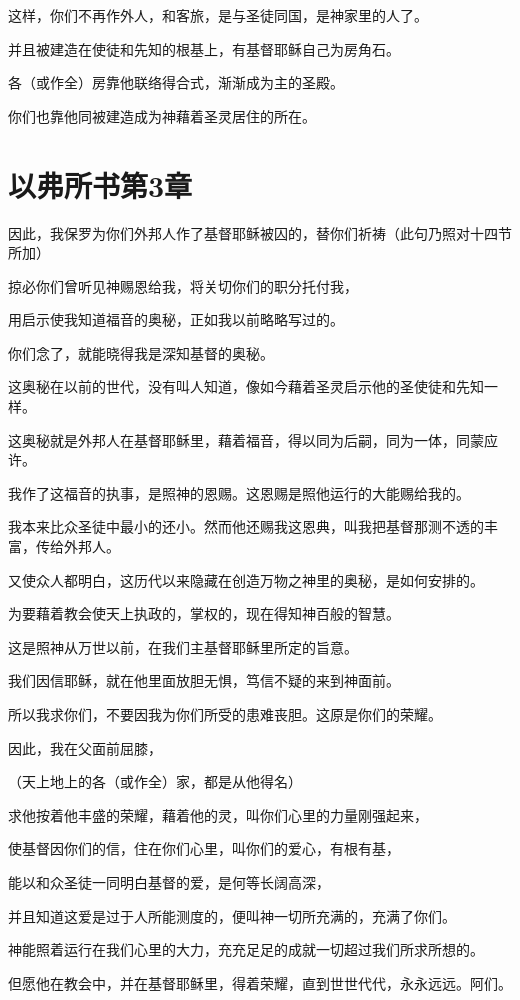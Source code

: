 \documentclass[12pt,oneside]{book}
\begin{document}
这样，你们不再作外人，和客旅，是与圣徒同国，是神家里的人了。

并且被建造在使徒和先知的根基上，有基督耶稣自己为房角石。

各（或作全）房靠他联络得合式，渐渐成为主的圣殿。

你们也靠他同被建造成为神藉着圣灵居住的所在。

\chapter{以弗所书第3章}
因此，我保罗为你们外邦人作了基督耶稣被囚的，替你们祈祷（此句乃照对十四节所加）

掠必你们曾听见神赐恩给我，将关切你们的职分托付我，

用启示使我知道福音的奥秘，正如我以前略略写过的。

你们念了，就能晓得我是深知基督的奥秘。

这奥秘在以前的世代，没有叫人知道，像如今藉着圣灵启示他的圣使徒和先知一样。

这奥秘就是外邦人在基督耶稣里，藉着福音，得以同为后嗣，同为一体，同蒙应许。

我作了这福音的执事，是照神的恩赐。这恩赐是照他运行的大能赐给我的。

我本来比众圣徒中最小的还小。然而他还赐我这恩典，叫我把基督那测不透的丰富，传给外邦人。

又使众人都明白，这历代以来隐藏在创造万物之神里的奥秘，是如何安排的。

为要藉着教会使天上执政的，掌权的，现在得知神百般的智慧。

这是照神从万世以前，在我们主基督耶稣里所定的旨意。

我们因信耶稣，就在他里面放胆无惧，笃信不疑的来到神面前。

所以我求你们，不要因我为你们所受的患难丧胆。这原是你们的荣耀。

因此，我在父面前屈膝，

（天上地上的各（或作全）家，都是从他得名）

求他按着他丰盛的荣耀，藉着他的灵，叫你们心里的力量刚强起来，

使基督因你们的信，住在你们心里，叫你们的爱心，有根有基，

能以和众圣徒一同明白基督的爱，是何等长阔高深，

并且知道这爱是过于人所能测度的，便叫神一切所充满的，充满了你们。

神能照着运行在我们心里的大力，充充足足的成就一切超过我们所求所想的。

但愿他在教会中，并在基督耶稣里，得着荣耀，直到世世代代，永永远远。阿们。
\end{document}
